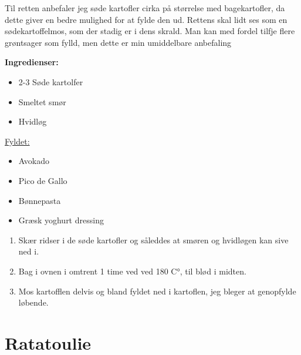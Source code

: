 \documentclass{book}
\begin{document}
Til retten anbefaler jeg søde kartofler cirka på størrelse med bagekartofler, da dette giver en bedre mulighed for at fylde den ud. Rettens skal lidt ses som en sødekartoffelmos, som der stadig er i dens skrald. Man kan med fordel tilfje flere grøntsager som fylld, men dette er min umiddelbare anbefaling\\
\begin{minipage}[t]{0.5\textwidth}
\textbf{Ingredienser:}
\begin{itemize}
    \item 2-3 Søde kartolfer
    \item Smeltet smør
    \item Hvidløg
\end{itemize}
\underline{Fyldet:}
\begin{itemize}
    \item Avokado 
    \item Pico de Gallo
    \item Bønnepasta
    \item Græsk yoghurt dressing 
\end{itemize}
\end{minipage}
\begin{minipage}[t]{0.5\textwidth}
\begin{enumerate}
    \item Skær ridser i de søde kartofler og såleddes at smøren og hvidløgen kan sive ned i.
    \item Bag i ovnen i omtrent 1 time ved ved 180 C°, til blød i midten.
    \item Mos kartofflen delvis og bland fyldet ned i kartoflen, jeg bleger at genopfylde løbende.  
\end{enumerate}
\end{minipage}
\newpage
{}
\newpage \section{Ratatoulie}
\end{document}
